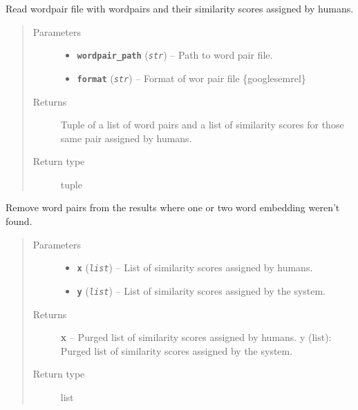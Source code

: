 \documentclass[letterpaper,10pt,english]{sphinxmanual}
\begin{document}
\begin{fulllineitems}
\label{src.eval:src.eval.word_similarity.read_wordpairs}
Read wordpair file with wordpairs and their similarity scores assigned by humans.
\begin{quote}\begin{description}
\item[{Parameters}] \leavevmode\begin{itemize}
\item {} 
\textbf{\texttt{wordpair\_path}} (\emph{\texttt{str}}) -- Path to word pair file.

\item {} 
\textbf{\texttt{format}} (\emph{\texttt{str}}) -- Format of wor pair file \{google\textbar{}semrel\}

\end{itemize}

\item[{Returns}] \leavevmode
Tuple of a list of word pairs and a list of similarity scores for those same pair assigned by humans.

\item[{Return type}] \leavevmode
tuple

\end{description}\end{quote}

\end{fulllineitems}


\begin{fulllineitems}
\label{src.eval:src.eval.word_similarity.remove_unknowns}
Remove word pairs from the results where one or two word embedding weren't found.
\begin{quote}\begin{description}
\item[{Parameters}] \leavevmode\begin{itemize}
\item {} 
\textbf{\texttt{x}} (\emph{\texttt{list}}) -- List of similarity scores assigned by humans.

\item {} 
\textbf{\texttt{y}} (\emph{\texttt{list}}) -- List of similarity scores assigned by the system.

\end{itemize}

\item[{Returns}] \leavevmode
\textbf{x} -- Purged list of similarity scores assigned by humans.
y (list): Purged list of similarity scores assigned by the system.

\item[{Return type}] \leavevmode
list

\end{description}\end{quote}

\end{fulllineitems}
\end{document}
